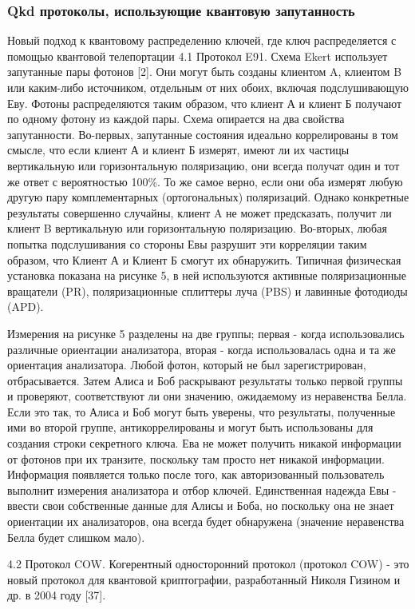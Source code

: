 \subsubsection{Qkd протоколы, использующие квантовую запутанность}
Новый подход к квантовому распределению ключей, где ключ распределяется с помощью квантовой телепортации
4.1 Протокол E91. Схема Ekert использует запутанные пары фотонов [2]. Они могут быть созданы клиентом A, клиентом B или каким-либо источником, отдельным от них обоих, включая подслушивающую Еву. Фотоны распределяются таким образом, что клиент А и клиент Б получают по одному фотону из каждой пары.
Схема опирается на два свойства запутанности. Во-первых, запутанные состояния идеально коррелированы в том смысле, что если клиент А и клиент Б измерят, имеют ли их частицы вертикальную или горизонтальную поляризацию, они всегда получат один и тот же ответ с вероятностью 100\%. То же самое верно, если они оба измерят любую другую пару комплементарных (ортогональных) поляризаций. Однако конкретные результаты совершенно случайны, клиент A не может предсказать, получит ли клиент B вертикальную или горизонтальную поляризацию.
Во-вторых, любая попытка подслушивания со стороны Евы разрушит эти корреляции таким образом, что Клиент А и Клиент Б смогут их обнаружить.
Типичная физическая установка показана на рисунке 5, в ней используются активные поляризационные вращатели (PR), поляризационные сплиттеры луча (PBS) и лавинные фотодиоды (APD).

Измерения на рисунке 5 разделены на две группы; первая - когда использовались различные ориентации анализатора, вторая - когда использовалась одна и та же ориентация анализатора. Любой фотон, который не был зарегистрирован, отбрасывается. Затем Алиса и Боб раскрывают результаты только первой группы и проверяют, соответствуют ли они значению, ожидаемому из неравенства Белла. Если это так, то Алиса и Боб могут быть уверены, что результаты, полученные ими во второй группе, антикоррелированы и могут быть использованы для создания строки секретного ключа. Ева не может получить никакой информации от фотонов при их транзите, поскольку там просто нет никакой информации. Информация появляется только после того, как авторизованный пользователь выполнит измерения анализатора и отбор ключей. Единственная надежда Евы - ввести свои собственные данные для Алисы и Боба, но поскольку она не знает ориентации их анализаторов, она всегда будет обнаружена (значение неравенства Белла будет слишком мало).

4.2 Протокол COW. Когерентный односторонний протокол (протокол COW) - это новый протокол для квантовой криптографии, разработанный Николя Гизином и др. в 2004 году [37].

